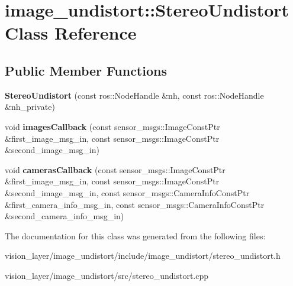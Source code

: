 \hypertarget{classimage__undistort_1_1StereoUndistort}{}\section{image\+\_\+undistort\+:\+:Stereo\+Undistort Class Reference}
\label{classimage__undistort_1_1StereoUndistort}
\subsection*{Public Member Functions}
\begin{DoxyCompactItemize}
\item 
\mbox{\label{classimage__undistort_1_1StereoUndistort_af3bf32a77407c7215207924a162977bc}} 
{\bfseries Stereo\+Undistort} (const ros\+::\+Node\+Handle \&nh, const ros\+::\+Node\+Handle \&nh\+\_\+private)
\item 
\mbox{\label{classimage__undistort_1_1StereoUndistort_a9abf2fc33ca143e07050be7743b2c88f}} 
void {\bfseries images\+Callback} (const sensor\+\_\+msgs\+::\+Image\+Const\+Ptr \&first\+\_\+image\+\_\+msg\+\_\+in, const sensor\+\_\+msgs\+::\+Image\+Const\+Ptr \&second\+\_\+image\+\_\+msg\+\_\+in)
\item 
\mbox{\label{classimage__undistort_1_1StereoUndistort_a2f77ff134b9e21b00732c4747b007739}} 
void {\bfseries cameras\+Callback} (const sensor\+\_\+msgs\+::\+Image\+Const\+Ptr \&first\+\_\+image\+\_\+msg\+\_\+in, const sensor\+\_\+msgs\+::\+Image\+Const\+Ptr \&second\+\_\+image\+\_\+msg\+\_\+in, const sensor\+\_\+msgs\+::\+Camera\+Info\+Const\+Ptr \&first\+\_\+camera\+\_\+info\+\_\+msg\+\_\+in, const sensor\+\_\+msgs\+::\+Camera\+Info\+Const\+Ptr \&second\+\_\+camera\+\_\+info\+\_\+msg\+\_\+in)
\end{DoxyCompactItemize}


The documentation for this class was generated from the following files\+:\begin{DoxyCompactItemize}
\item 
vision\+\_\+layer/image\+\_\+undistort/include/image\+\_\+undistort/stereo\+\_\+undistort.\+h\item 
vision\+\_\+layer/image\+\_\+undistort/src/stereo\+\_\+undistort.\+cpp\end{DoxyCompactItemize}
